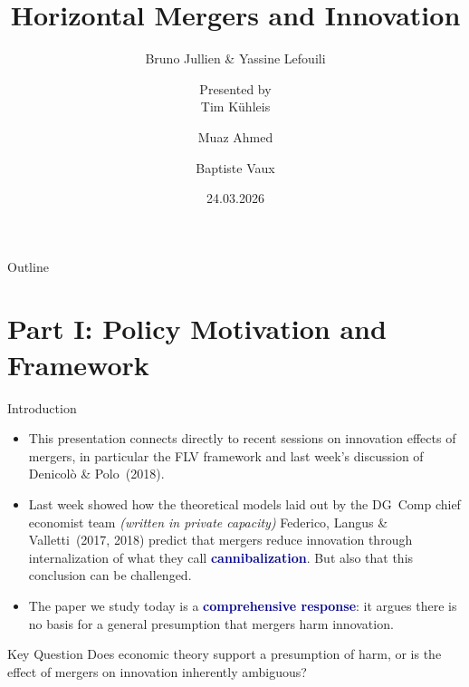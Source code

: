 \documentclass[10pt, aspectratio=169]{beamer}
\title[Horizontal Mergers \& Innovation]{\textbf{Horizontal Mergers and Innovation}}
\subtitle{Bruno Jullien \& Yassine Lefouili}
\author{Presented by\\ Tim K\"uhleis \and Muaz Ahmed \and Baptiste Vaux}
\institute{Paris School of Economics}
\date{24.03.2026}
\newcommand{\highlight}[1]{\textcolor{darkblue}{\textbf{#1}}}
\begin{document}
\begin{frame}
\titlepage
\end{frame}

\begin{frame}{Outline}
\tableofcontents
\end{frame}
\section{Part I: Policy Motivation and Framework}

\begin{frame}{Introduction}
\small

\begin{itemize}
    \setlength{\itemsep}{0.5em}
    \item This presentation connects directly to recent sessions on innovation effects of mergers, in particular the FLV framework and last week's discussion of Denicolò \& Polo~(2018).
    \item Last week showed how the theoretical models laid out by the DG~Comp chief economist team \textit{(written in private capacity)} Federico, Langus \& Valletti~(2017, 2018) predict that mergers reduce innovation through internalization of what they call \highlight{cannibalization}. But also that this conclusion can be challenged.
    \item The paper we study today is a \highlight{comprehensive response}: it argues there is no basis for a general presumption that mergers harm innovation.
\end{itemize}

\vspace{0.4cm}

\begin{block}{Key Question}
Does economic theory support a presumption of harm, or is the effect of mergers on innovation inherently ambiguous?
\end{block}
\end{frame}
\end{document}
